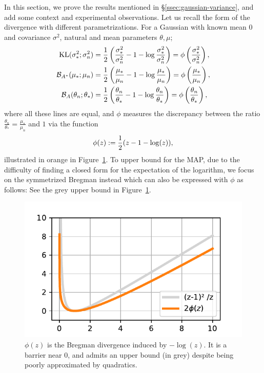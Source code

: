 \documentclass[twoside]{article}
\newcommand{\logpart}{A}
\newcommand{\conj}{{\logpart^*}}
\newcommand{\bregman}{\cB_\logpart}
\newcommand{\bregmanconj}{\cB_{\logpart^*}}
\newcommand{\nat}{\theta}
\newcommand{\m}{\mu}
\begin{document}
In this section, we prove the results mentioned in \S\ref{ssec:gaussian-variance},
and add some context and experimental observations.
Let us recall the form of the divergence with different parametrizations.
For a Gaussian with known mean $0$ and covariance $\sigma^2$, 
natural and mean parameters $\theta, \m$;
\begin{align}
	\KL( \sigma_*^2 ; \sigma_n^2 ) 
	&= \half \left ( \frac{\sigma_*^2}{ \sigma_n^2} - 1 - \log \frac{\sigma_*^2}{ \sigma_n^2} \right)
	= \phi\paren{\frac{\sigma_*^2}{ \sigma_n^2}},
	\\
	\bregmanconj(\m_*; \m_n) 
	&= \half \left ( \frac{\m_*}{ \m_n} - 1 - \log  \frac{\m_*}{ \m_n} \right) 
	= \phi\paren{\frac{\m_*}{ \m_n}},
	\\
	\bregman( \nat_n; \nat_* ) 
	&=  \half \left ( \frac{ \nat_n}{\nat_*} - 1 - \log  \frac{ \nat_n}{\nat_*} \right)
	= \phi\paren{\frac{ \nat_n}{\nat_*}},
\end{align}
where all these lines are equal, and $\phi$ measures the discrepancy between the ratio $\frac{ \nat_n}{\nat_*} =  \frac{\m_*}{ \m_n}  $ and $1$ via the function
\begin{align}
	\phi(z) := \frac{1}{2} (z - 1 - \log(z)),
\end{align}
illustrated in orange in Figure~\ref{fig:phi}.
To upper bound for the MAP, due to the difficulty of finding a closed form for the expectation of the logarithm, we focus on the symmetrized Bregman instead
\alignn{
	\bregmanconj( \mu_*; \mu_n) 
	\leq \cS_{\conj} (\mu_*, \mu_n ) 
	:= \bregmanconj( \mu_*; \mu_n)  + \bregmanconj( \mu_n; \mu_*) 
	= \half \paren{\frac{ \mu_*}{\mu_n} -1 +\frac{ \mu_n}{\mu_*} - 1 },
	\label{eq:symmetrized_bregman}
}
which can also be expressed with $\phi$ as follows:
See the grey upper bound in Figure~\ref{fig:phi}.

\begin{figure}[ht]
	\centering
	\includegraphics[width=.4\textwidth]{phi.pdf}
	\caption{%
	$\phi(z)$ is the Bregman divergence induced by $-\log(z)$. 
	It is a barrier near $0$, and admits an upper bound (in grey) despite being poorly approximated by quadratics.
	}
	\label{fig:phi}
\end{figure}
\end{document}
